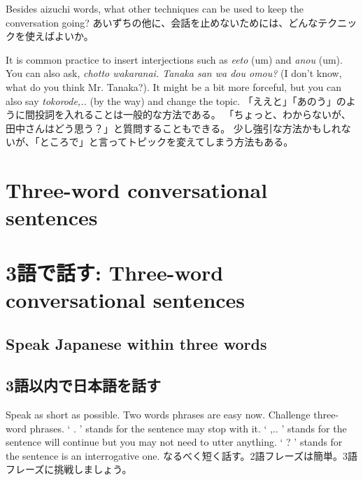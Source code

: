 \documentclass[uplatex,dvipdfmx,b5paper,english,10pt]{jsbook}
\begin{document}
\begin{toiquestion}
\ifEnglish
Besides aizuchi words, what other techniques can be used to keep the conversation going?
\else
あいずちの他に、会話を止めないためには、どんなテクニックを使えばよいか。
\fi
\end{toiquestion}
\begin{toianswer}
\ifEnglish
It is common practice to insert interjections such as {\it eeto\/} (um) and {\it anou\/} (um).
You can also ask, {\it chotto wakaranai. Tanaka san wa dou omou?\/} (I don't know, what do you think Mr. Tanaka?).
It might be a bit more forceful, but you can also say {\it tokorode,..\/} (by the way) and change the topic.
\else
「ええと」「あのう」のように間投詞を入れることは一般的な方法である。
「ちょっと、わからないが、田中さんはどう思う？」と質問することもできる。
少し強引な方法かもしれないが、「ところで」と言ってトピックを変えてしまう方法もある。
\fi
\end{toianswer}


%
%

\ifEnglish
\section{Three-word conversational sentences}
\else
\section{3語で話す: Three-word conversational sentences}
\fi



\ifEnglish
\subsection{Speak Japanese within three words}
\else
\subsection{3語以内で日本語を話す}
\fi
\begin{toiquestion}
\ifEnglish
Speak as short as possible.  Two words phrases are easy now.  Challenge three-word phrases.
 ` . ' stands for the sentence may stop with it.
 ` ,.. ' stands for the sentence will continue but you may not need to utter anything.
 ` ? ' stands for the sentence is an interrogative one.
\else
なるべく短く話す。2語フレーズは簡単。3語フレーズに挑戦しましょう。
\fi
\end{toiquestion}
\end{document}
